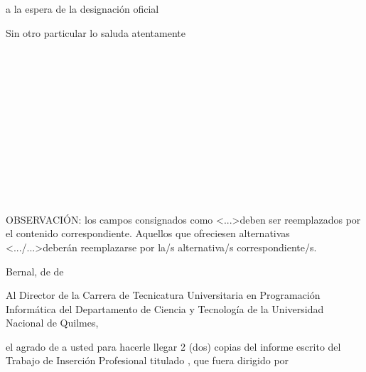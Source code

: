  a la espera de la designación oficial

Sin otro particular lo saluda atentamente\\ \\
\begin{flushright}
\\
\\
\\
\\
\\
\\
\\
\\
\\
\\
\end{flushright}


OBSERVACIÓN: los campos consignados como \textless...\textgreater deben ser
reemplazados por el contenido correspondiente. Aquellos que ofreciesen
alternativas \textless.../...\textgreater deberán reemplazarse por la/s
alternativa/s correspondiente/s.



\begin{flushright}
Bernal,  de  de 
\end{flushright}

Al Director de la Carrera de Tecnicatura Universitaria en Programación Informática del
Departamento de Ciencia y Tecnología de la
Universidad Nacional de Quilmes,


\hrulefill

 el agrado de  a
usted para hacerle llegar 2 (dos) copias del informe escrito del Trabajo de Inserción
Profesional titulado , que
fuera dirigido por 

